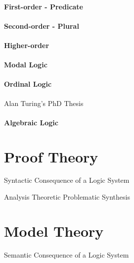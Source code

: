 \documentclass{article}
\begin{document}
\subsection{First-order - Predicate}

\subsection{Second-order - Plural}

\subsection{Higher-order}

\subsection{Modal Logic}

\subsection{Ordinal Logic}

Alan Turing's PhD Thesis \cite{turing38}

\subsection{Algebraic Logic}

\part{Proof Theory}

Syntactic Consequence of a Logic System

Analysis
    Theoretic
    Problematic
Synthesis


\part{Model Theory}

Semantic Consequence of a Logic System

\end{document}
